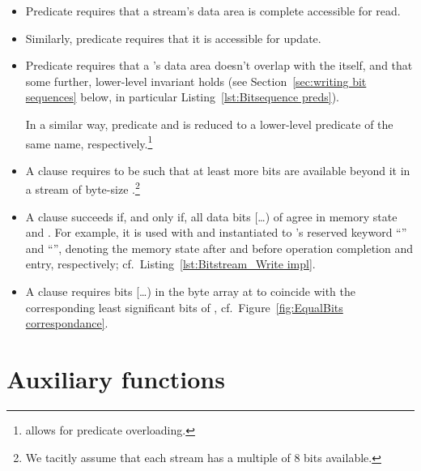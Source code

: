 \FloatBarrier

\begin{itemize}
\item Predicate  requires that a stream's data area is
	complete accessible for read.
\item Similarly, predicate  requires that it is
	accessible for update.

\item Predicate  requires that a 
	's data area
	doesn't overlap with the  itself, and that some
	further, lower-level invariant holds (see 
	Section~\ref{sec:writing bit sequences} below, in particular
	Listing~\ref{lst:Bitsequence preds}).

	In a similar way, predicate  and
	 is reduced to a
	lower-level predicate of the same 
	name, 
	respectively.\footnote{\framac allows for predicate overloading.}

\item
	A clause  requires
	 to be such that at least 
	more bits are available beyond it in a stream of byte-size
	.\footnote{
		We tacitly assume that each stream has a multiple of 8 bits
		available.
	}

\item
	A clause
	 succeeds if,
	and only if, 
	all data bits [\ldots{})
	of  agree in memory state  and
	.
	For example, it is used with  and 
	instantiated to \framac's reserved keyword ``'' and
	``'', denoting the memory state after and before
	operation completion and entry, respectively; cf.\
	Listing~\ref{lst:Bitstream_Write impl}.

\item
	A clause  requires 
	bits [\ldots{}) in
	the byte array at  to coincide with the
	corresponding least significant bits of ,
	cf.~Figure~\ref{fig:EqualBits correspondance}.
\end{itemize}



\section{Auxiliary  functions}
\label{sec:bitstream-aux}


